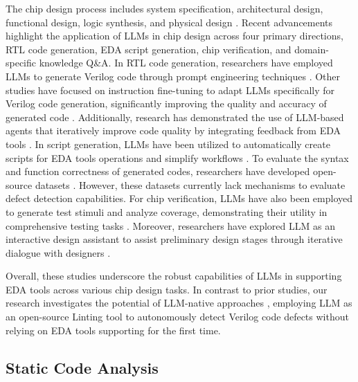 The chip design process includes system specification, architectural design, functional design, logic synthesis, and physical design \cite{conf/aspdac/LiHT0ZWLQLLSCBZ24}. Recent advancements highlight the application of LLMs in chip design across four primary directions, RTL code generation, EDA script generation, chip verification, and domain-specific knowledge Q\&A. In RTL code generation, researchers have employed LLMs to generate Verilog code through prompt engineering techniques \cite{journals/corr/abs-2305-14019,journals/corr/abs-2311-04887}. Other studies have focused on instruction fine-tuning to adapt LLMs specifically for Verilog code generation, significantly improving the quality and accuracy of generated code \cite{journals/todaes/ThakurAPTDKG24,conf/icml/PeiZYH024,journals/corr/abs-2407-10424,journals/corr/abs-2407-18333}. Additionally, research has demonstrated the use of LLM-based agents that iteratively improve code quality by integrating feedback from EDA tools \cite{journals/corr/abs-2312-08617,journals/corr/abs-2408-08927}. In script generation, LLMs have been utilized to automatically create scripts for EDA tools operations and simplify workflows \cite{conf/dac/ChangWY0JZCLYZZ24,journals/tcad/WuHZYZZY24}. To evaluate the syntax and function correctness of generated codes, researchers have developed open-source datasets \cite{conf/aspdac/LuLZX24,journals/corr/abs-2407-01910}. However, these datasets currently lack mechanisms to evaluate defect detection capabilities. For chip verification, LLMs have also been employed to generate test stimuli and analyze coverage, demonstrating their utility in comprehensive testing tasks \cite{journals/corr/abs-2406-04373,journals/corr/abs-2405-02326,conf/date/XiaoDYCWZDWTX24,journals/corr/abs-2310-04535}. Moreover, researchers have explored LLM as an interactive design assistant to assist preliminary design stages through iterative dialogue with designers \cite{conf/mlcad/BlockloveGKP23,journals/corr/abs-2311-00176}. 

Overall, these studies underscore the robust capabilities of LLMs in supporting EDA tools across various chip design tasks. In contrast to prior studies, our research investigates the potential of LLM-native approaches \cite{chen2024large}, employing LLM as an open-source Linting tool to autonomously detect Verilog code defects without relying on EDA tools supporting for the first time.


\subsection{Static Code Analysis}

